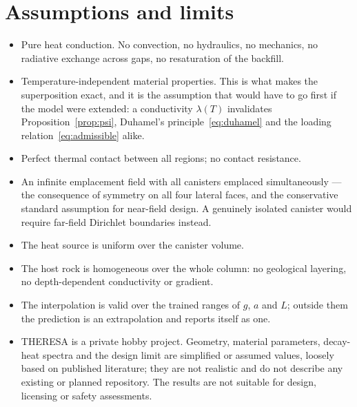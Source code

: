 \documentclass[11pt,a4paper]{article}
\theoremstyle{plain}
\begin{document}
\section{Assumptions and limits}\label{sec:limits}

\begin{itemize}[nosep,leftmargin=*]
  \item Pure heat conduction. No convection, no hydraulics, no mechanics, no
        radiative exchange across gaps, no resaturation of the backfill.
  \item Temperature-independent material properties. This is what makes the
        superposition exact, and it is the assumption that would have to go
        first if the model were extended: a conductivity $\lambda(T)$ invalidates
        Proposition~\ref{prop:psi}, Duhamel's principle~\eqref{eq:duhamel} and
        the loading relation~\eqref{eq:admissible} alike.
  \item Perfect thermal contact between all regions; no contact resistance.
  \item An infinite emplacement field with all canisters emplaced
        simultaneously --- the consequence of symmetry on all four lateral
        faces, and the conservative standard assumption for near-field design. A
        genuinely isolated canister would require far-field Dirichlet boundaries
        instead.
  \item The heat source is uniform over the canister volume.
  \item The host rock is homogeneous over the whole column: no geological
        layering, no depth-dependent conductivity or gradient.
  \item The interpolation is valid over the trained ranges of $g$, $a$ and $L$;
        outside them the prediction is an extrapolation and reports itself as
        one.
  \item THERESA is a private hobby project. Geometry, material parameters,
        decay-heat spectra and the design limit are simplified or assumed
        values, loosely based on published literature; they are not realistic
        and do not describe any existing or planned repository. The results
        are not suitable for design, licensing or safety assessments.
\end{itemize}
\end{document}
